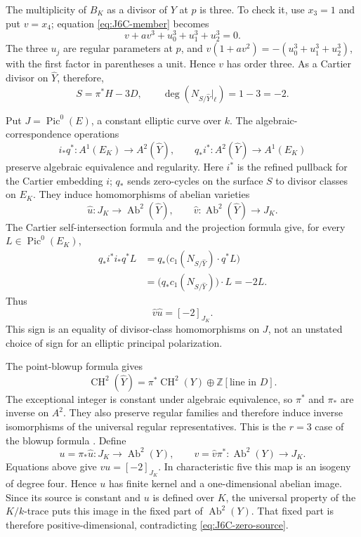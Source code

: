 The multiplicity of $B_K$ as a divisor of $Y$ at $p$ is
three. To check it, use $x_3=1$ and put $v=x_4$; equation
\eqref{eq:J6C-member} becomes
\[
 v+a v^3+u_0^3+u_1^3+u_2^3=0.
\]
The three $u_j$ are regular parameters at $p$, and
$v(1+a v^2)=-(u_0^3+u_1^3+u_2^3)$, with the first factor
in parentheses a unit. Hence $v$ has order three. As a
Cartier divisor on $\widehat Y$, therefore,
\[
 S=\pi^*H-3D,
 \qquad
 \deg(N_{S/\widehat Y}|_\ell)=1-3=-2.
\]

Put $J=\operatorname{Pic}^0(E)$, a constant elliptic
curve over $k$. The algebraic-correspondence operations
\[
 i_*q^*:A^1(E_K)\longrightarrow A^2(\widehat Y),\qquad
 q_*i^*:A^2(\widehat Y)\longrightarrow A^1(E_K)
\]
preserve algebraic equivalence and regularity. Here $i^*$
is the refined pullback for the Cartier embedding $i$;
$q_*$ sends zero-cycles on the surface $S$ to divisor
classes on $E_K$. They induce homomorphisms of abelian
varieties
\[
 \widehat u:J_K\longrightarrow\operatorname{Ab}^2(\widehat Y),
 \qquad
 \widehat v:\operatorname{Ab}^2(\widehat Y)\longrightarrow J_K.
\]
The Cartier self-intersection formula
\cite[Definition 42.29.1(1)(b)]{DGJ_StacksGysin}
and the projection formula
\cite[Lemma 42.26.4]{DGJ_StacksProjection} give,
for every $L\in\operatorname{Pic}^0(E_K)$,
\begin{align*}
 q_*i^*i_*q^*L
 &=q_*\bigl(c_1(N_{S/\widehat Y})\cdot q^*L\bigr)\\
 &=\bigl(q_*c_1(N_{S/\widehat Y})\bigr)\cdot L=-2L.
\end{align*}
Thus
\begin{equation}\label{eq:J6C-minus-two}
 \widehat v\widehat u=[-2]_{J_K}.
\end{equation}
This sign is an equality of divisor-class homomorphisms
on $J$, not an unstated choice of sign for an elliptic
principal polarization.

The point-blowup formula gives
\[
 \operatorname{CH}^2(\widehat Y)
    =\pi^*\operatorname{CH}^2(Y)\oplus\mathbb Z[\text{line in }D].
\]
The exceptional integer is constant under algebraic
equivalence, so $\pi^*$ and $\pi_*$ are inverse on $A^2$.
They also preserve regular families and therefore induce
inverse isomorphisms of the universal regular
representatives. This is the $r=3$ case of the blowup
formula \cite[Theorem 2.8(3)]{DGJ_Jiang2023}.
Define
\[
 u=\pi_*\widehat u:J_K\longrightarrow\operatorname{Ab}^2(Y),
 \qquad
 v=\widehat v\pi^*:\operatorname{Ab}^2(Y)\longrightarrow J_K.
\]
Equations above give $vu=[-2]_{J_K}$. In characteristic
five this map is an isogeny of degree four. Hence $u$ has
finite kernel and a one-dimensional abelian image. Since
its source is constant and $u$ is defined over $K$, the
universal property of the $K/k$-trace puts this image in
the fixed part of $\operatorname{Ab}^2(Y)$. That fixed
part is therefore positive-dimensional, contradicting
\eqref{eq:J6C-zero-source}.

